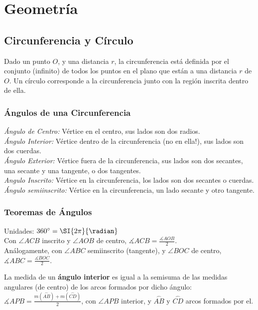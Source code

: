 \pagebreak
\section{Geometría}
\def\svgwidth{\columnwidth}
\subsection{Circunferencia y Círculo}
Dado un punto $O$, y una distancia $r$, la circunferencia está definida por el conjunto (infinito) de todos los puntos en el plano que están a una distancia $r$ de $O$. Un círculo corresponde a la circunferencia junto con la región inscrita dentro de ella.\\

\subsubsection{Ángulos de una Circunferencia}
\textit{Ángulo de Centro:} Vértice en el centro, sus lados son dos radios.\\
\textit{Ángulo Interior:} Vértice dentro de la circunferencia (no en ella!), sus lados son dos cuerdas.\\
\textit{Ángulo Exterior:} Vértice fuera de la circunferencia, sus lados son dos secantes, una secante y una tangente, o dos tangentes.\\
\textit{Angulo Inscrito:} Vértice en la circunferencia, los lados son dos secantes o cuerdas.\\
\textit{Ángulo semiinscrito:} Vértice en la circunferencia, un lado secante y otro tangente.\\

\subsubsection{Teoremas de Ángulos}
Unidades: $360^{\circ} = \SI{2\pi}{\radian}$\\

Con $\angle ACB$ inscrito y $\angle AOB$ de centro,
$\measuredangle ACB = \frac{\measuredangle AOB}{2}$.\\
Análogamente, con $\angle ABC$ semiinscrito (tangente), y $\angle BOC$ de centro, $\measuredangle ABC = \frac{\measuredangle BOC}{2}$.

La medida de un \textbf{ángulo interior} es igual a la semisuma de las medidas angulares (de centro) de los arcos formados por dicho ángulo:\\
$\measuredangle APB = \frac{m(\stackrel\frown{AB}) + m(\stackrel\frown{CD})}{2}$, con $\angle APB$ interior, y $\stackrel\frown{AB}$ y $\stackrel\frown{CD}$ arcos formados por el.\\

